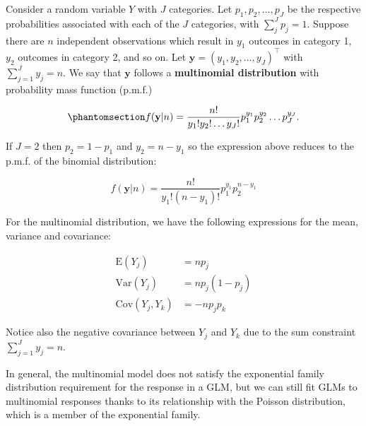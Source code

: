 \documentclass[
  letterpaper,
  DIV=11,
  numbers=noendperiod]{scrartcl}
\begin{document}
Consider a random variable \(Y\) with \(J\) categories. Let
\(p_1,p_2,\dots, p_J\) be the respective probabilities associated with
each of the \(J\) categories, with \(\sum_j^J p_j = 1\). Suppose there
are \(n\) independent observations which result in \(y_1\) outcomes in
category 1, \(y_2\) outcomes in category 2, and so on. Let
\(\mathbf{y}=(y_1,y_2,\dots,y_J)^\intercal\) with
\(\sum_{j=1}^J y_j = n\). We say that \(\mathbf{y}\) follows a
\textbf{multinomial distribution} with probability mass function
(p.m.f.)

\begin{equation}\phantomsection\label{eq-multinomial}{
f(\mathbf{y} | n)=\frac{n!}{y_1! y_2! \dots y_J!}p_1^{y_1}p_2^{y_2}\dots p_J^{y_J}.
}\end{equation}

\begin{tcolorbox}[enhanced jigsaw, leftrule=.75mm, arc=.35mm, colback=white, opacityback=0, breakable, title=\textcolor{quarto-callout-note-color}{\faInfo}\hspace{0.5em}{Note}, toprule=.15mm, opacitybacktitle=0.6, titlerule=0mm, rightrule=.15mm, bottomtitle=1mm, coltitle=black, toptitle=1mm, colframe=quarto-callout-note-color-frame, bottomrule=.15mm, colbacktitle=quarto-callout-note-color!10!white, left=2mm]

If \(J=2\) then \(p_2=1-p_1\) and \(y_2=n-y_1\) so the expression above
reduces to the p.m.f. of the binomial distribution:

\[
f(\mathbf{y} | n)=\frac{n!}{y_1! (n-y_1)!} p_1^{y_1}p_2^{n-y_1}
\]

\end{tcolorbox}

For the multinomial distribution, we have the following expressions for
the mean, variance and covariance:

\[
\begin{aligned}
\textrm{E}(Y_j)&=np_j\\\textrm{Var}(Y_j)&=np_j(1-p_j)\\\textrm{Cov}(Y_j,Y_k)&= -n p_jp_k
\end{aligned}
\]

Notice also the negative covariance between \(Y_j\) and \(Y_k\) due to
the sum constraint \(\sum_{j=1}^J y_j = n\).

In general, the multinomial model does not satisfy the exponential
family distribution requirement for the response in a GLM, but we can
still fit GLMs to multinomial responses thanks to its relationship with
the Poisson distribution, which is a member of the exponential family.
\end{document}
